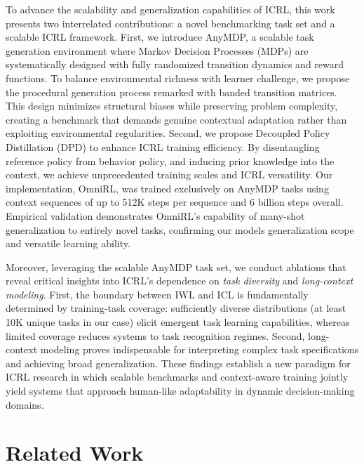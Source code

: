 \documentclass{article}
\begin{document}
To advance the scalability and generalization capabilities of ICRL, this work presents two interrelated contributions: a novel benchmarking task set and a scalable ICRL framework. First, we introduce AnyMDP, a scalable task generation environment where Markov Decision Processes (MDPs) are systematically designed with fully randomized transition dynamics and reward functions. To balance environmental richness with learner challenge, we propose the procedural generation process remarked with banded transition matrices. This design minimizes structural biases while preserving problem complexity, creating a benchmark that demands genuine contextual adaptation rather than exploiting environmental regularities. Second, we propose Decoupled Policy Distillation (DPD) to enhance ICRL training efficiency. By disentangling reference policy from behavior policy, and inducing prior knowledge into the context, we achieve unprecedented training scales and ICRL versatility. Our implementation, OmniRL, was trained exclusively on AnyMDP tasks using context sequences of up to 512K steps per sequence and 6 billion steps overall. Empirical validation demonstrates OmniRL's capability of many-shot generalization to entirely novel tasks, confirming our models generalization scope and versatile learning ability. 

Moreover, leveraging the scalable AnyMDP task set, we conduct ablations that reveal critical insights into ICRL’s dependence on \emph{task diversity} and \emph{long-context modeling}.
First, the boundary between IWL and ICL is fundamentally determined by training-task coverage: sufficiently diverse distributions (at least 10K unique tasks in our case) elicit emergent task learning capabilities, whereas limited coverage reduces systems to task recognition regimes.
Second, long-context modeling proves indispensable for interpreting complex task specifications and achieving broad generalization.
These findings establish a new paradigm for ICRL research in which scalable benchmarks and context-aware training jointly yield systems that approach human-like adaptability in dynamic decision-making domains.

\section{Related Work}
\end{document}
